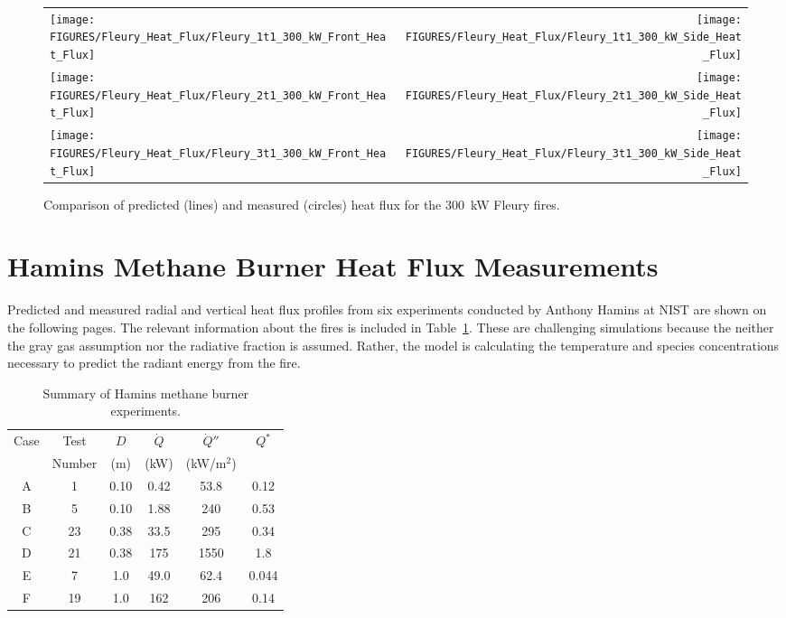 \begin{figure}[p]
\begin{tabular*}{\textwidth}{l@{\extracolsep{\fill}}r}
\texttt{[image: FIGURES/Fleury\_Heat\_Flux/Fleury\_1t1\_300\_kW\_Front\_Heat\_Flux]} &
\texttt{[image: FIGURES/Fleury\_Heat\_Flux/Fleury\_1t1\_300\_kW\_Side\_Heat\_Flux]} \\
\texttt{[image: FIGURES/Fleury\_Heat\_Flux/Fleury\_2t1\_300\_kW\_Front\_Heat\_Flux]} &
\texttt{[image: FIGURES/Fleury\_Heat\_Flux/Fleury\_2t1\_300\_kW\_Side\_Heat\_Flux]} \\
\texttt{[image: FIGURES/Fleury\_Heat\_Flux/Fleury\_3t1\_300\_kW\_Front\_Heat\_Flux]} &
\texttt{[image: FIGURES/Fleury\_Heat\_Flux/Fleury\_3t1\_300\_kW\_Side\_Heat\_Flux]}
\end{tabular*}
\label{Fleury_Heat_Flux_300_kW}
\caption[Fleury Heat Flux, 300 kW fires.]
{Comparison of predicted (lines) and measured (circles) heat flux for the 300~kW Fleury fires.}
\end{figure}

\clearpage

\section{Hamins Methane Burner Heat Flux Measurements}

Predicted and measured radial and vertical heat flux profiles from six experiments conducted by Anthony Hamins at NIST are shown on the following pages. The
relevant information about the fires is included in Table~\ref{Hamins_Table}. These are challenging simulations because the neither the gray gas assumption
nor the radiative fraction is assumed. Rather, the model is calculating the temperature and species concentrations necessary to predict the radiant energy from the fire.

\begin{table}[ht]
\caption{Summary of Hamins methane burner experiments. }
\begin{center}
\begin{tabular}{|c|c|c|c|c|c|}
\hline
Case     & Test     & $D$  & $\dot{Q}$   &  $\dot{Q}''$   & $Q^*$   \\
         & Number   & (m)  & (kW)        &  (kW/m$^2$)    &         \\ \hline \hline
A        & 1        & 0.10 & 0.42        &  53.8          & 0.12    \\ \hline
B        & 5        & 0.10 & 1.88        &  240           & 0.53    \\ \hline
C        & 23       & 0.38 & 33.5        &  295           & 0.34    \\ \hline
D        & 21       & 0.38 & 175         &  1550          & 1.8     \\ \hline
E        & 7        & 1.0  & 49.0        &  62.4          & 0.044   \\ \hline
F        & 19       & 1.0  & 162         &  206           & 0.14    \\ \hline
\end{tabular}
\end{center}
\label{Hamins_Table}
\end{table}

